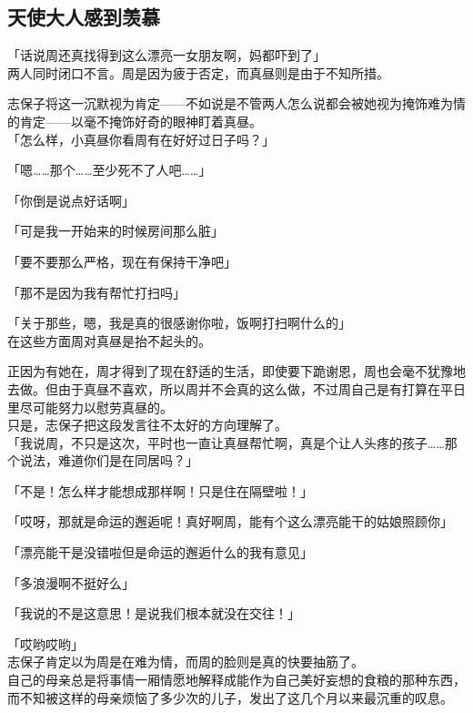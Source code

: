 \subsection{天使大人感到羡慕}

「话说周还真找得到这么漂亮一女朋友啊，妈都吓到了」\\

两人同时闭口不言。周是因为疲于否定，而真昼则是由于不知所措。

志保子将这一沉默视为肯定——不如说是不管两人怎么说都会被她视为掩饰难为情的肯定——以毫不掩饰好奇的眼神盯着真昼。\\

「怎么样，小真昼你看周有在好好过日子吗？」

「嗯……那个……至少死不了人吧……」

「你倒是说点好话啊」

「可是我一开始来的时候房间那么脏」

「要不要那么严格，现在有保持干净吧」

「那不是因为我有帮忙打扫吗」

「关于那些，嗯，我是真的很感谢你啦，饭啊打扫啊什么的」\\

在这些方面周对真昼是抬不起头的。

正因为有她在，周才得到了现在舒适的生活，即使要下跪谢恩，周也会毫不犹豫地去做。但由于真昼不喜欢，所以周并不会真的这么做，不过周自己是有打算在平日里尽可能努力以慰劳真昼的。\\

只是，志保子把这段发言往不太好的方向理解了。\\

「我说周，不只是这次，平时也一直让真昼帮忙啊，真是个让人头疼的孩子……那个说法，难道你们是在同居吗？」

「不是！怎么样才能想成那样啊！只是住在隔壁啦！」

「哎呀，那就是命运的邂逅呢！真好啊周，能有个这么漂亮能干的姑娘照顾你」

「漂亮能干是没错啦但是命运的邂逅什么的我有意见」

「多浪漫啊不挺好么」

「我说的不是这意思！是说我们根本就没在交往！」%

「哎哟哎哟」\\

志保子肯定以为周是在难为情，而周的脸则是真的快要抽筋了。\\

自己的母亲总是将事情一厢情愿地解释成能作为自己美好妄想的食粮的那种东西，而不知被这样的母亲烦恼了多少次的儿子，发出了这几个月以来最沉重的叹息。\\

